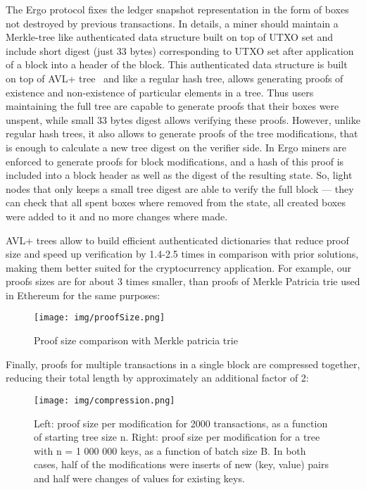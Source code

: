 The Ergo protocol fixes the ledger snapshot representation in the form of boxes not destroyed by previous transactions.
In details, a miner should maintain a Merkle-tree like authenticated data structure built on top of UTXO set and include
short digest (just 33 bytes) corresponding to UTXO set after application of a block into a header of the block.
This authenticated data structure is built on top of AVL+ tree~\cite{reyzin2017improving} and like a regular hash tree,
allows generating proofs of existence and non-existence of particular elements in a tree.
Thus users maintaining the full tree are capable to generate proofs that their boxes were unspent, while small 33 bytes
digest allows verifying these proofs.
However, unlike regular hash trees, it also allows to generate proofs of the tree modifications, that is enough to calculate a new tree digest on the verifier side.
In Ergo miners are enforced to generate proofs for block modifications, and a hash of this proof is included into
a block header as well as the digest of the resulting state.
So, light nodes that only keeps a small tree digest are able to verify the full block --- they can check that all spent boxes where
removed from the state, all created boxes were added to it and no more changes where made.

AVL+ trees allow to build efficient authenticated dictionaries that reduce proof size and speed
up verification by 1.4-2.5 times in comparison with prior solutions, making them better suited for the cryptocurrency application.
For example, our proofs sizes are for about 3 times smaller, than proofs of Merkle Patricia trie used in Ethereum
for the same purposes:


\begin{figure}[H]
    \centering
    \texttt{[image: img/proofSize.png]}
    \caption{Proof size comparison with Merkle patricia trie
    \label{fig:proofSize} }
\end{figure}

Finally, proofs for multiple transactions in a single block are compressed together, reducing their total length
by approximately an additional factor of 2:

\begin{figure}[H]
    \centering
    \texttt{[image: img/compression.png]}
    \caption{Left: proof size per modification for 2000 transactions, as a function of starting tree size n.
    Right: proof size per modification for a tree with n = 1 000 000 keys, as a function of batch size B.
    In both cases, half of the modifications were inserts of new (key, value) pairs and half were changes
    of values for existing keys.
    \label{fig:compression} }
\end{figure}

